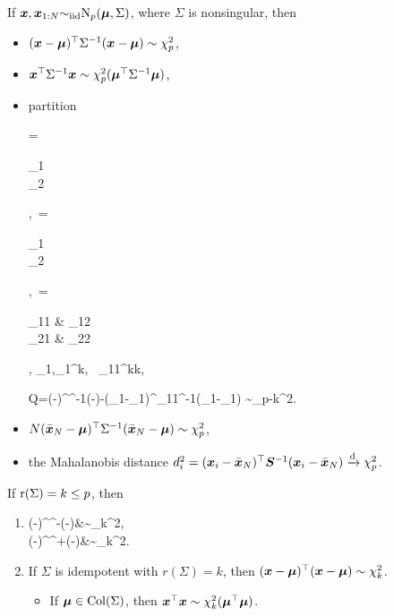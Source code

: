 \documentclass[10pt,a4paper]{book}
\begin{document}
\begin{thmbox}
	\begin{theorem}\label{thm:quad_MVN}
		If ${\boldsymbol x},{\boldsymbol x}_{1:N}{\sim}_{\mathrm{iid}}\mathrm{N}_p({\boldsymbol\mu},\Sigma)$, where $\Sigma$ is nonsingular, then 
		\begin{itemize}
			\item $({\boldsymbol x}-{\boldsymbol\mu})^\top \Sigma^{-1}({\boldsymbol x}-{\boldsymbol\mu})\sim\chi_p^2$,
			\item ${\boldsymbol x}^\top \Sigma^{-1}{\boldsymbol x}\sim\chi_p^2({\boldsymbol\mu}^\top\Sigma^{-1}{\boldsymbol\mu})$,
			\item partition
			\begin{sequation*}
				\x = \begin{bmatrix}
					\x_1 \\ \x_2
				\end{bmatrix},\ \bam=\begin{bmatrix}
					\bam_1 \\ \bam_2
				\end{bmatrix},\ \Sigma=\begin{bmatrix}
					\Sigma_{11} & \Sigma_{12} \\ \Sigma_{21} & \Sigma_{22}
				\end{bmatrix}, \quad \x_1,\bam_1\in\bbR^{k}, \ \Sigma_{11}\in\bbR^{k\times k}, 
			\end{sequation*} 
			\begin{sequation*}
				Q=(\x-\bam)^\TT \Sigma^{-1}(\x-\bam)-(\x_1-\bam_1)^\TT \Sigma_{11}^{-1}(\x_1-\bam_1) \sim \chi_{p-k}^2.
			\end{sequation*}
			\item $N(\bar{{\boldsymbol x}}_N-{\boldsymbol\mu})^{\top}\Sigma^{-1}(\bar{{\boldsymbol x}}_N-{\boldsymbol\mu})\sim\chi_p^2$,
			\item the Mahalanobis distance
			$d_i^2=(\boldsymbol{x}_i-\bar{\boldsymbol{x}}_N)^{\top}{{\boldsymbol S}}^{-1}(\boldsymbol{x}_i-\bar{\boldsymbol{x}}_N) \xrightarrow{\mathrm{d}} \chi_p^2$.
		\end{itemize} 
		If $\mathrm{r}(\Sigma)=k\leq p$, then 
		\begin{enumerate}
			\item 
			\begin{sequation*}
				\begin{aligned}
					(\x-\bam)^\TT \Sigma^{-}(\x-\bam)&\sim\chi_{k}^2,\\
					(\x-\bam)^\TT \Sigma^{+}(\x-\bam)&\sim\chi_{k}^2.
				\end{aligned}
			\end{sequation*}
			\item If $\Sigma$ is idempotent with $r(\Sigma)=k$, then $({\boldsymbol x}-{\boldsymbol\mu})^\top  ({\boldsymbol x}-{\boldsymbol\mu})\sim\chi_k^2$.  
			\begin{itemize}
				\item If ${\boldsymbol\mu}\in\mathrm{Col}(\Sigma)$, then ${\boldsymbol x}^\top {\boldsymbol x}\sim\chi_k^2({\boldsymbol\mu}^\top {\boldsymbol\mu})$.  
			\end{itemize}
		\end{enumerate}
	\end{theorem}
\end{thmbox}
\end{document}
